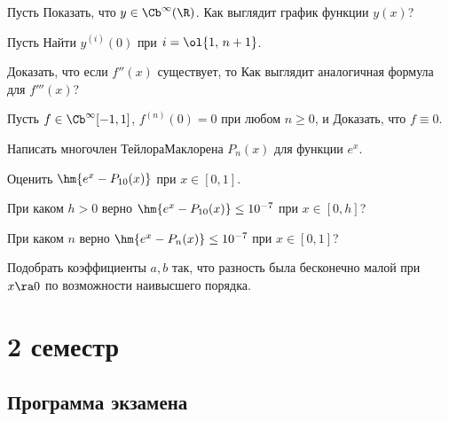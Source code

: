 \documentclass[a4paper]{article}
\begin{document}
\begin{problem}
Пусть
Показать, что $y \in \Cb^\infty(\R)$. Как выглядит график функции $y(x)$?
\end{problem}

\begin{problem}
Пусть
Найти $y^{(i)}(0)$ при $i=\ol{1,\, n+1}$.
\end{problem}

\begin{problem}
Доказать, что если $f''(x)$ существует, то
Как выглядит аналогичная формула для $f'''(x)$?
\end{problem}

\begin{problem}
Пусть $f \in\Cb^\infty[-1,1]$, $f^{(n)}(0)=0$ при любом $n \ge 0$, и
Доказать, что $f \equiv 0$.
\end{problem}

\begin{problem}
Написать многочлен Тейлора\ч Маклорена $P_n(x)$ для функции $e^x$.

 Оценить $\hm{e^x - P_{10}(x)}$ при $x \in[0,1]$.

 При каком $h > 0$ верно $\hm{e^x - P_{10}(x)} \le 10^{-7}$ при $x \in [0,h]$?

 При каком $n$ верно $\hm{e^x - P_n(x)} \le 10^{-7}$ при $x \in [0,1]$?
\end{problem}

\begin{problem}
Подобрать коэффициенты $a,b $ так, что разность
была бесконечно малой при $x \ra 0$ по возможности наивысшего порядка.
\end{problem}

\pagebreak

\section{2 семестр}

\subsection{Программа экзамена}
\end{document}
